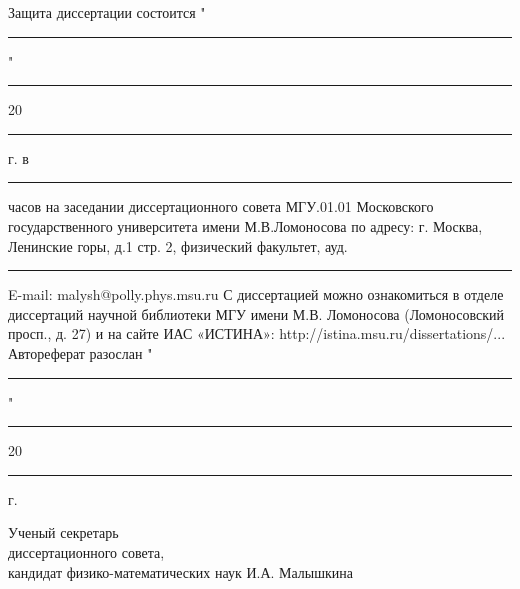 \vfill


Защита диссертации состоится  "\rule{3mm}{0.15mm}" \rule{15mm}{0.15mm} 20\rule{3mm}{0.15mm} г. в \rule{5mm}{0.15mm} часов на заседании диссертационного совета МГУ.01.01 Московского государственного университета имени М.В.Ломоносова по адресу: г. Москва, Ленинские горы, д.1 стр. 2, физический факультет, ауд.\rule{5mm}{0.15mm}
\bigbreak
E-mail: malysh@polly.phys.msu.ru
\bigbreak
С диссертацией можно ознакомиться в отделе диссертаций научной библиотеки МГУ имени М.В. Ломоносова (Ломоносовский просп., д. 27) и на сайте ИАС «ИСТИНА»: http://istina.msu.ru/dissertations/...
Автореферат разослан "\rule{3mm}{0.15mm}" \rule{15mm}{0.15mm} 20\rule{3mm}{0.15mm} г.

\bigbreak

{\parindent0pt Ученый секретарь \\
диссертационного совета, \\
кандидат физико-математических наук \hfill	И.А. Малышкина}

\newpage